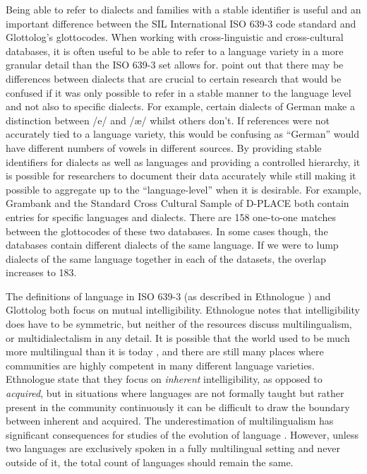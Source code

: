 \documentclass[a4paper,10pt]{article} %
\begin{document}
Being able to refer to dialects and families with a stable identifier is useful and an important difference between the SIL International ISO 639-3 code standard and Glottolog's glottocodes. When working with cross-linguistic and cross-cultural databases, it is often useful to be able to refer to a language variety in a more granular detail than the ISO 639-3 set allows for. \citet{nordhoff2011glottolog} point out that there may be differences between dialects that are crucial to certain research that would be confused if it was only possible to refer in a stable manner to the language level and not also to specific dialects. For example, certain dialects of German make a distinction between /e\textipa{:}/ and /æ\textipa{:}/ whilst others don't. If references were not accurately tied to a language variety, this would be confusing as ``German'' would have different numbers of vowels in different sources. By providing stable identifiers for dialects as well as languages and providing a controlled hierarchy, it is possible for researchers to document their data accurately while still making it possible to aggregate up to the ``language-level'' when it is desirable. For example, Grambank and the Standard Cross Cultural Sample of D-PLACE both contain entries for specific languages and dialects. There are 158 one-to-one matches between the glottocodes of these two databases. In some cases though, the databases contain different dialects of the same language. If we were to lump dialects of the same language together in each of the datasets, the overlap increases to 183.

The definitions of language in ISO 639-3 (as described in Ethnologue \citep{ethnologue2019lgident}) and Glottolog both focus on mutual intelligibility. Ethnologue notes that intelligibility does have to be symmetric, but neither of the resources discuss multilingualism, or multidialectalism in any detail. It is possible that the world used to be much more multilingual than it is today \citep{evans2017did}, and there are still many places where communities are highly competent in many different language varieties. Ethnologue state that they focus on \emph{inherent} intelligibility, as opposed to \emph{acquired}, but in situations where languages are not formally taught but rather present in the community continuously it can be difficult to draw the boundary between inherent and acquired. The underestimation of multilingualism has significant consequences for studies of the evolution of language \citep{roberts2013evolutionary}. However, unless two languages are exclusively spoken in a fully multilingual setting and never outside of it, the total count of languages should remain the same. 
\end{document}
